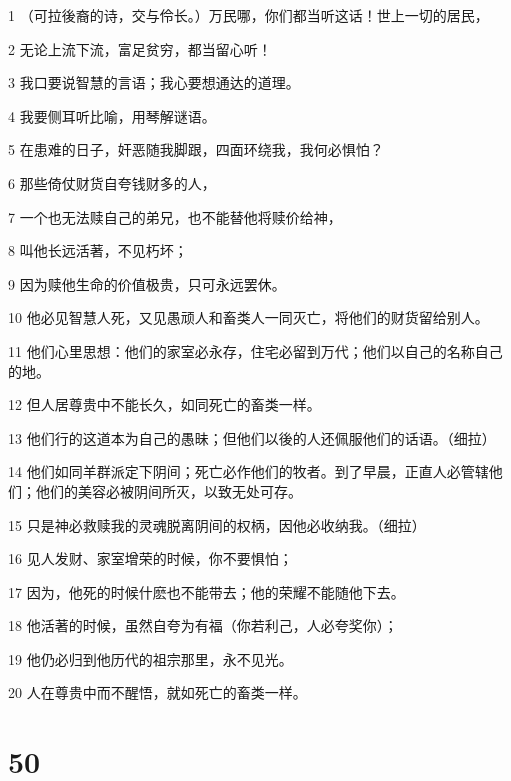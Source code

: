 \par 1 （可拉後裔的诗，交与伶长。）万民哪，你们都当听这话！世上一切的居民，
\par 2 无论上流下流，富足贫穷，都当留心听！
\par 3 我口要说智慧的言语；我心要想通达的道理。
\par 4 我要侧耳听比喻，用琴解谜语。
\par 5 在患难的日子，奸恶随我脚跟，四面环绕我，我何必惧怕？
\par 6 那些倚仗财货自夸钱财多的人，
\par 7 一个也无法赎自己的弟兄，也不能替他将赎价给神，
\par 8 叫他长远活著，不见朽坏；
\par 9 因为赎他生命的价值极贵，只可永远罢休。
\par 10 他必见智慧人死，又见愚顽人和畜类人一同灭亡，将他们的财货留给别人。
\par 11 他们心里思想：他们的家室必永存，住宅必留到万代；他们以自己的名称自己的地。
\par 12 但人居尊贵中不能长久，如同死亡的畜类一样。
\par 13 他们行的这道本为自己的愚昧；但他们以後的人还佩服他们的话语。（细拉）
\par 14 他们如同羊群派定下阴间；死亡必作他们的牧者。到了早晨，正直人必管辖他们；他们的美容必被阴间所灭，以致无处可存。
\par 15 只是神必救赎我的灵魂脱离阴间的权柄，因他必收纳我。（细拉）
\par 16 见人发财、家室增荣的时候，你不要惧怕；
\par 17 因为，他死的时候什麽也不能带去；他的荣耀不能随他下去。
\par 18 他活著的时候，虽然自夸为有福（你若利己，人必夸奖你）；
\par 19 他仍必归到他历代的祖宗那里，永不见光。
\par 20 人在尊贵中而不醒悟，就如死亡的畜类一样。

\chapter{50}

